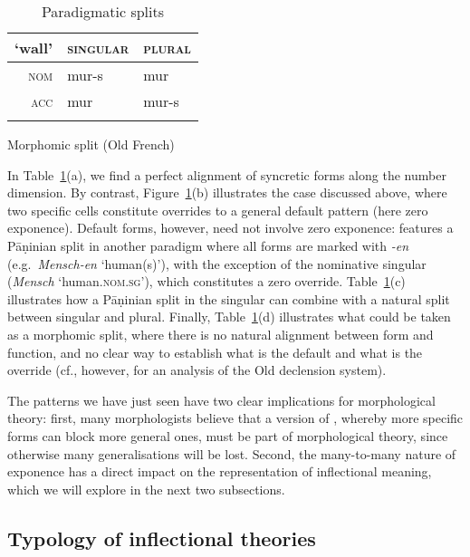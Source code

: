 \documentclass[output=paper,biblatex,babelshorthands,newtxmath,draftmode,colorlinks,citecolor=brown]{langscibook}
\begin{document}
\begin{table}
\begin{subtable}{.50\textwidth}
    \centering
    \begin{tabular}{r|ll}
      \lsptoprule
      `wall' & \textsc{singular} & \textsc{plural}\\
      \midrule
      \textsc{nom} & mur-s & mur\\
      \textsc{acc} & mur & mur-s\\
      \lspbottomrule
    \end{tabular}

    \caption{Morphomic split (Old French)}
  \end{subtable}
  
  
  \caption{Paradigmatic splits}
  \label{tab:ParaSplit}
\end{table}

In Table~\ref{tab:ParaSplit}(a), we find a perfect alignment of
syncretic forms along the number dimension. By contrast,
Figure~\ref{tab:ParaSplit}(b) illustrates the case discussed above,
where two specific cells constitute overrides to a general default
pattern (here zero exponence). Default forms, however, need not
involve zero exponence:  features a Pāṇinian split in another
paradigm where all forms are marked with \textit{-en}
(e.g.\ \textit{Mensch-en} `human(s)'), with the exception of the
nominative singular (\textit{Mensch} `human\textsc{.nom.sg}'), which
constitutes a zero override. Table~\ref{tab:ParaSplit}(c) illustrates
how a Pāṇinian split in the singular can combine with a natural split
between singular and plural. Finally, Table~\ref{tab:ParaSplit}(d)
illustrates what could be taken as a morphomic split, where there is no
natural alignment between form and function, and no clear way to
establish what is the default and what is the override (cf., however,
\citealt{Crysmann:Kihm:2018} for an analysis of the Old 
declension system).

The patterns we have just seen have two clear implications for
morphological theory: first, many morphologists believe that
a version of , whereby more specific forms can block
more general ones, must be part of morphological theory, since
otherwise many generalisations will be lost. 
Second, the many-to-many nature of exponence has a direct impact on
the representation of inflectional meaning, which we will explore in
the next two subsections. 

\subsection{Typology of inflectional theories}
\label{sec:InflTypology}
\end{document}
